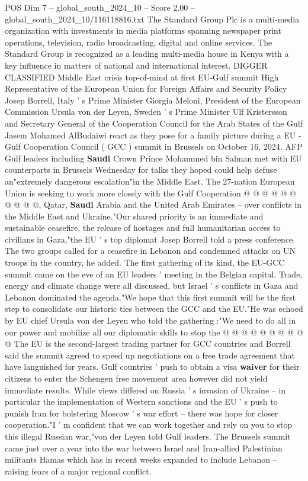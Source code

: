 \begin{textsample}{POS Dim 7 – global\_south\_2024\_10 – Score 2.00 – global\_south\_2024\_10/116118816.txt}  \label{ex:f7_pos_207}
The Standard Group Plc is a multi-media organization with investments in media platforms spanning newspaper print operations, television, radio broadcasting, digital and online services.
The Standard Group is recognized as a leading multi-media house in Kenya with a key influence in matters of national and international interest.
DIGGER CLASSIFIED Middle East crisis top-of-mind at first EU-Gulf summit High Representative of the European Union for Foreign Affairs and Security Policy Josep Borrell, Italy ' s Prime Minister Giorgia Meloni, President of the European Commission Ursula von der Leyen, Sweden ' s Prime Minister Ulf Kristersson and Secretary General of the Cooperation Council for the Arab States of the Gulf Jasem Mohamed AlBudaiwi react as they pose for a family picture during a EU - Gulf Cooperation Council ( GCC ) summit in Brussels on October 16, 2024.
AFP Gulf leaders including \textbf{Saudi} Crown Prince Mohammed bin Salman met with EU counterparts in Brussels Wednesday for talks they hoped could help defuse an"extremely dangerous escalation"in the Middle East.
The 27-nation European Union is seeking to work more closely with the Gulf Cooperation @ @ @ @ @ @ @ @ @ @, Qatar, \textbf{Saudi} Arabia and the United Arab Emirates -- over conflicts in the Middle East and Ukraine."Our shared priority is an immediate and sustainable ceasefire, the release of hostages and full humanitarian access to civilians in Gaza,"the EU ' s top diplomat Josep Borrell told a press conference.
The two groups called for a ceasefire in Lebanon and condemned attacks on UN troops in the country, he added.
The first gathering of its kind, the EU-GCC summit came on the eve of an EU leaders ' meeting in the Belgian capital.
Trade, energy and climate change were all discussed, but Israel ' s conflicts in Gaza and Lebanon dominated the agenda."We hope that this first summit will be the first step to consolidate our historic ties between the GCC and the EU."He was echoed by EU chief Ursula von der Leyen who told the gathering :"We need to do all in our power and mobilize all our diplomatic skills to stop the @ @ @ @ @ @ @ @ @ @ The EU is the second-largest trading partner for GCC countries and Borrell said the summit agreed to speed up negotiations on a free trade agreement that have languished for years.
Gulf countries ' push to obtain a visa \textbf{waiver} for their citizens to enter the Schengen free movement area however did not yield immediate results.
While views differed on Russia ' s invasion of Ukraine -- in particular the implementation of Western sanctions and the EU ' s push to punish Iran for bolstering Moscow ' s war effort -- there was hope for closer cooperation."I ' m confident that we can work together and rely on you to stop this illegal Russian war,"von der Leyen told Gulf leaders.
The Brussels summit came just over a year into the war between Israel and Iran-allied Palestinian militants Hamas which has in recent weeks expanded to include Lebanon -- raising fears of a major regional conflict.

\end{textsample}
